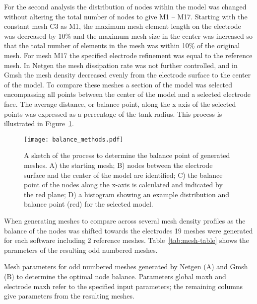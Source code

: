 \documentclass[12pt]{iopart}
\newcommand{\COMMENT}[1]{ \textsf{\color{blue}{{COMMENT: #1}}} }
\begin{document}
For the second analysis the distribution of nodes within the 
model was changed without altering 
the total number of nodes to give M1 -- M17. 
Starting with the constant mesh C3 as M1, the maximum mesh element 
length on the electrode was decreased by 10\% and the maximum mesh size in the center was
increased so that the total number of elements in the mesh was  within 10\% of the 
original mesh. For mesh M17 the specified electrode refinement was equal to the reference mesh. 
In Netgen the mesh dissipation rate was not further controlled, and in Gmsh the mesh density 
decreased evenly from the electrode surface to the center of the model. 
To compare these meshes a section of the model was selected
encompassing all points between the center of the model and a selected electrode face.
The average 
distance, or balance point, along the x axis of the selected points was expressed 
as a percentage of the tank radius.
This process is illustrated in Figure~\ref{fig:balanceMethods}.
 
\begin{figure}
  \texttt{[image: balance\_methods.pdf]}
  \caption{\label{fig:balanceMethods} A sketch of the process to determine the 
  balance point of generated meshes. A) the starting mesh; B) nodes between the
  electrode surface and the center of the model are identified; C) the 
  balance point of the nodes along the x-axis is calculated and indicated 
  by the red plane; D) a histogram showing an example distribution and balance point (red)
  for the selected model.}
\end{figure}

When generating meshes to compare across several mesh density profiles as the balance of the nodes was shifted 
towards the electrodes 19 meshes were generated for each software including 2 reference meshes. 
Table~\ref{tab:mesh-table} shows the parameters of the resulting odd numbered meshes. 

\begin{table}[]
\caption{\label{tab:mesh-table}Mesh parameters for odd numbered meshes generated by Netgen (A) and Gmsh (B) 
to determine the optimal 
node balance. Parameters global maxh and electrode maxh refer to the specified input parameters; the remaining 
columns give parameters from the resulting meshes.}

\end{table}

%
%
%
\end{document}
